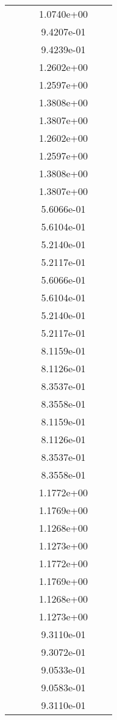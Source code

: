 \begin{xltabular}{\textwidth}{r|rS[table-format=1.3e+2]S[table-format=1.4e+2]S[table-format=1.4e+2]S[table-format=-1.5]}
&  &  & 1.0740e+00 & & \\
&  &  & 9.4207e-01 & & \\
&  &  & 9.4239e-01 & & \\
&  &  & 1.2602e+00 & & \\
&  &  & 1.2597e+00 & & \\
&  &  & 1.3808e+00 & & \\
&  &  & 1.3807e+00 & & \\
&  &  & 1.2602e+00 & & \\
&  &  & 1.2597e+00 & & \\
&  &  & 1.3808e+00 & & \\
&  &  & 1.3807e+00 & & \\
&  &  & 5.6066e-01 & & \\
&  &  & 5.6104e-01 & & \\
&  &  & 5.2140e-01 & & \\
&  &  & 5.2117e-01 & & \\
&  &  & 5.6066e-01 & & \\
&  &  & 5.6104e-01 & & \\
&  &  & 5.2140e-01 & & \\
&  &  & 5.2117e-01 & & \\
&  &  & 8.1159e-01 & & \\
&  &  & 8.1126e-01 & & \\
&  &  & 8.3537e-01 & & \\
&  &  & 8.3558e-01 & & \\
&  &  & 8.1159e-01 & & \\
&  &  & 8.1126e-01 & & \\
&  &  & 8.3537e-01 & & \\
&  &  & 8.3558e-01 & & \\
&  &  & 1.1772e+00 & & \\
&  &  & 1.1769e+00 & & \\
&  &  & 1.1268e+00 & & \\
&  &  & 1.1273e+00 & & \\
&  &  & 1.1772e+00 & & \\
&  &  & 1.1769e+00 & & \\
&  &  & 1.1268e+00 & & \\
&  &  & 1.1273e+00 & & \\
&  &  & 9.3110e-01 & & \\
&  &  & 9.3072e-01 & & \\
&  &  & 9.0533e-01 & & \\
&  &  & 9.0583e-01 & & \\
&  &  & 9.3110e-01 & & \\

\end{xltabular}
